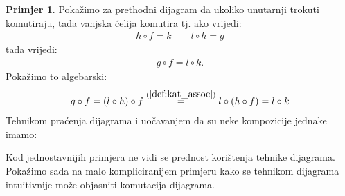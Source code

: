 \documentclass[11pt]{article}
\theoremstyle{definition}
\newtheorem{primjer}{Primjer}
\begin{document}
  \begin{primjer} Pokažimo za prethodni dijagram da ukoliko unutarnji trokuti
    komutiraju, tada vanjska ćelija komutira tj. ako vrijedi:
    \begin{align*}
      h \circ f = k \qquad  l \circ h = g
    \end{align*}
    tada vrijedi:
    \begin{align*}
      g \circ f = l \circ k.
    \end{align*}
    Pokažimo to algebarski:
    \begin{align*}
      g \circ f = (l \circ h) \circ f \overset{(\ref{def:kat_assoc})}{=} l \circ (h \circ f) = l \circ k
    \end{align*}
    Tehnikom praćenja dijagrama i uočavanjem da su neke kompozicije jednake
    imamo:
    \begin{center}
    \end{center}
  \end{primjer}

  Kod jednostavnijih primjera ne vidi se prednost korištenja tehnike dijagrama.
  Pokažimo sada na malo kompliciranijem primjeru kako se tehnikom dijagrama
  intuitivnije može objasniti komutacija dijagrama.
\end{document}
